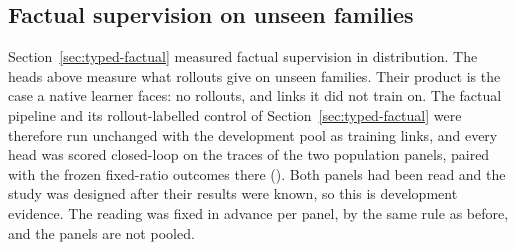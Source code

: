 \documentclass[10pt]{article}
\begin{document}
\subsection{Factual supervision on unseen families}
\label{sec:typed-factual-unseen}
Section~\ref{sec:typed-factual} measured factual supervision in distribution. The heads above measure what rollouts give on unseen families. Their product is the case a native learner faces: no rollouts, and links it did not train on. The factual pipeline and its rollout-labelled control of Section~\ref{sec:typed-factual} were therefore run unchanged with the development pool as training links, and every head was scored closed-loop on the traces of the two population panels, paired with the frozen fixed-ratio outcomes there (). Both panels had been read and the study was designed after their results were known, so this is development evidence. The reading was fixed in advance per panel, by the same rule as before, and the panels are not pooled.

\begin{table}[t]
\centering\small
\resizebox{\linewidth}{!}{}
\caption{Factual supervision trained on the development pool: closed-loop utility gain over the fixed ratio with family-level 95\% $t$ intervals, \TypedUnseenSeeds{} seeds. Unseen panel A is the replication panel of Section~\ref{sec:typed-replication} and panel B the formerly sealed panel; neither is drawn from by any fitting or selection step. On the same traces the frozen regression head of this study gains \TypedUnseenPanelARefRegress{} and \TypedUnseenPanelBRefRegress{} and its typed head \TypedUnseenPanelARefHead{} and \TypedUnseenPanelBRefHead{}.}\label{tab:followup-factual-unseen}
\end{table}
\end{document}
